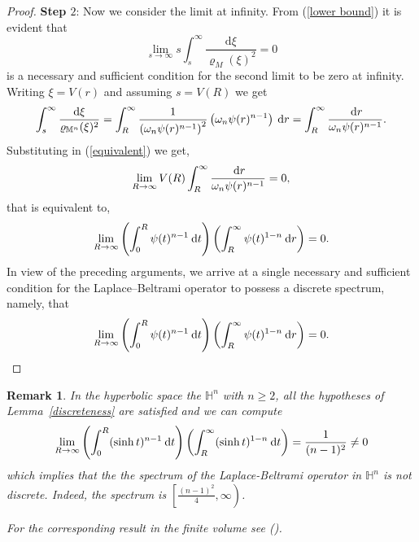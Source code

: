\documentclass[a4paper,11pt,reqno]{amsart}
\renewcommand\eqref[1]{(\ref{#1})}
\theoremstyle{plain}
\newtheorem{remark}{Remark}[section]
\numberwithin{equation}{section} \allowdisplaybreaks
\newcommand{\hn}{\mathbb{H}^n}
\newcommand{\m}{\mathbb{M}^n}
\newcommand{\dt}{\:{\rm d}t}
\newcommand{\dr}{\:{\rm d}r}
\newcommand{\uv}{\omega_n}
\begin{document}
\begin{proof}
\textbf{Step $2$}: Now we consider the limit at infinity. From \eqref{lower bound} it is evident that 
\begin{equation}\label{equivalent}
    \lim_{s \to \infty} s\int_s^{\infty}\frac{\mathrm{d}\xi}{\varrho_M(\xi)^2}=0
\end{equation}
    is a necessary and sufficient condition for the second limit to be zero at infinity. Writing $\xi=V(r)$ and assuming $s=V(R)$ we get
    \begin{equation*}
        \int_s^{\infty} \frac{\mathrm{d}\xi}{\varrho_{\m}(\xi)^2}=\int_R^{\infty}\frac{1}{\left(\uv \psi(r)^{n-1}\right)^2}\left(\uv \psi(r)^{n-1}\right)\dr=\int_R^{\infty}\frac{\dr}{\uv \psi(r)^{n-1}}.
    \end{equation*}
Substituting in \eqref{equivalent} we get,
\begin{equation*}
    \lim_{R \to \infty} V(R)\int_R^{\infty}\frac{\dr}{\uv \psi(r)^{n-1}}=0,
\end{equation*}
that is equivalent to,
\begin{equation*}
    \lim_{R \to \infty}\left( \int_0^R \psi(t)^{n-1}\dt\right)\left(\int_R^{\infty}\psi(t)^{1-n}\dr\right)=0.
\end{equation*}
    In view of the preceding arguments, we arrive at a single necessary and sufficient condition for the Laplace–Beltrami operator to possess a discrete spectrum, namely, that
    \begin{equation*}
        \lim_{R \to \infty}\left( \int_0^R \psi(t)^{n-1}\dt\right)\left(\int_R^{\infty}\psi(t)^{1-n}\dr\right)=0.
    \end{equation*}
\end{proof}

\begin{remark}
  \rm In the hyperbolic space the $\hn$ with $n\geq 2$, all the hypotheses of Lemma~\ref{discreteness} are satisfied and we can compute 
  \begin{equation*}
      \lim_{R \to \infty}\left(\int_0^R (\sinh t)^{n-1}\dt\right)\left(\int_R^{\infty}(\sinh t)^{1-n}\dt\right)=\frac{1}{(n-1)^2} \neq 0
  \end{equation*}
  which implies that the the spectrum of the Laplace-Beltrami operator in $\hn$ is not discrete. Indeed, the spectrum is $\left[\frac{(n-1)^2}{4},\infty\right)$.
  
  For the corresponding result in the finite volume see (\cite[Proposition~2.7]{CM}).\rm
\end{remark}

\medskip
\end{document}
